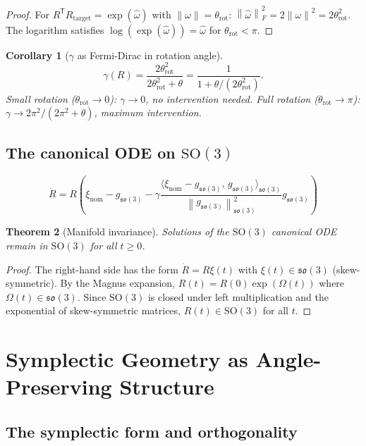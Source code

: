 \documentclass[11pt,a4paper,openany]{book}
\newtheorem{theorem}{Theorem}[chapter]
\newtheorem{corollary}[theorem]{Corollary}
\theoremstyle{definition}
\newcommand{\T}{^{\mathsf{T}}}
\newcommand{\norm}[1]{\left\|#1\right\|}
\newcommand{\inner}[2]{\langle #1,\,#2\rangle}
\newcommand{\nom}{\mathrm{nom}}
\newcommand{\so}{\mathfrak{so}}
\newcommand{\SO}{\mathrm{SO}}
\begin{document}
\begin{proof}
For $R\T R_\mathrm{target} = \exp(\hat\omega)$ with $\norm{\omega} = \theta_\mathrm{rot}$:
$\norm{\hat\omega}_F^2 = 2\norm{\omega}^2 = 2\theta_\mathrm{rot}^2$.
The logarithm satisfies $\log(\exp(\hat\omega)) = \hat\omega$ for $\theta_\mathrm{rot} < \pi$.
\end{proof}

\begin{corollary}[$\gamma$ as Fermi-Dirac in rotation angle]
\[
\gamma(R) = \frac{2\theta_\mathrm{rot}^2}{2\theta_\mathrm{rot}^2 + \theta} = \frac{1}{1 + \theta/(2\theta_\mathrm{rot}^2)}.
\]
Small rotation ($\theta_\mathrm{rot} \to 0$): $\gamma \to 0$, no intervention needed.
Full rotation ($\theta_\mathrm{rot} \to \pi$): $\gamma \to 2\pi^2/(2\pi^2+\theta)$, maximum intervention.
\end{corollary}

\section{The canonical ODE on $\SO(3)$}

\begin{lockedbox}
\[
\dot R = R\!\left(\xi_\nom - g_{\so(3)} - \gamma\frac{\inner{\xi_\nom - g_{\so(3)}}{g_{\so(3)}}_{\so(3)}}{\norm{g_{\so(3)}}^2_{\so(3)}}g_{\so(3)}\right)
\]
\end{lockedbox}

\begin{theorem}[Manifold invariance]
Solutions of the $\SO(3)$ canonical ODE remain in $\SO(3)$ for all $t \geq 0$.
\end{theorem}

\begin{proof}
The right-hand side has the form $\dot R = R\xi(t)$ with $\xi(t) \in \so(3)$ (skew-symmetric).
By the Magnus expansion, $R(t) = R(0)\exp(\Omega(t))$ where $\Omega(t) \in \so(3)$.
Since $\SO(3)$ is closed under left multiplication and the exponential of skew-symmetric matrices,
$R(t) \in \SO(3)$ for all $t$.
\end{proof}

\chapter{Symplectic Geometry as Angle-Preserving Structure}

\section{The symplectic form and orthogonality}
\end{document}
